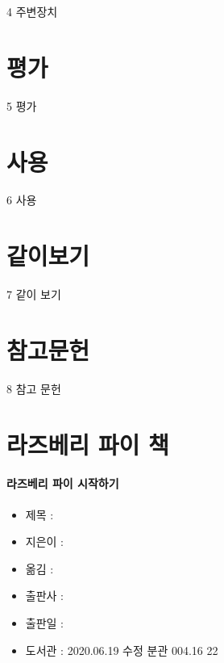 \documentclass[12pt, a4paper, oneside]{book}
\let\stdsection\section
\renewcommand\section{\newpage\stdsection}
\begin{document}
4	주변장치


	\section{ 평가}

5	평가

	\section{ 사용}

6	사용


	\section{ 같이보기}

7	같이 보기

	\section{ 참고문헌}
8	참고 문헌

%
	\section{라즈베리 파이 책 }


\paragraph{라즈베리 파이 시작하기}

\begin{itemize}[					
		topsep=0.0em,			
		parsep=0.0em,			
		itemsep=0em,			
		leftmargin=	3	em,
		labelwidth=	1	em,			
		labelsep=		1	 em			
]					
	\item	제목 	: 
	\item	지은이 	:
	\item	옮김 	:
	\item	출판사 	: 
	\item	출판일 	:	 
	\item	도서관 	: 2020.06.19 수정 분관 004.16 22

\end{itemize}					
\end{document}
